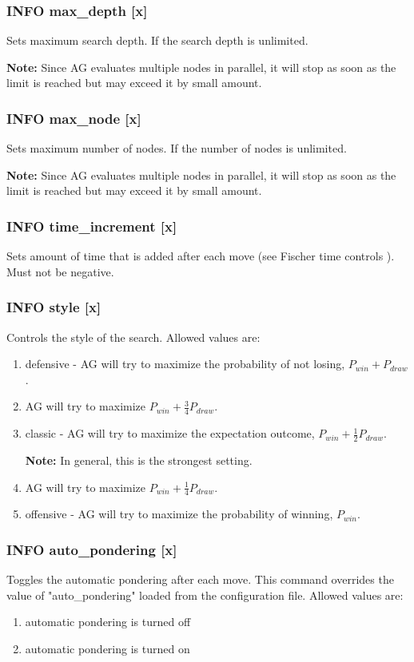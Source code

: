 \documentclass[12pt,a4paper]{article}
\begin{document}
\subsubsection{INFO max{\_}depth [x]}
Sets maximum search depth. If  the search depth is unlimited.

\textbf{Note:} Since AG evaluates multiple nodes in parallel, it will stop as soon as the limit is reached but may exceed it by small amount.

\subsubsection{INFO max{\_}node [x]}
Sets maximum number of nodes. If  the number of nodes is unlimited.

\textbf{Note:} Since AG evaluates multiple nodes in parallel, it will stop as soon as the limit is reached but may exceed it by small amount.

\subsubsection{INFO time{\_}increment [x]}
Sets amount of time that is added after each move (see Fischer time controls \cite{fischer}). Must not be negative.

\subsubsection{INFO style [x]}
Controls the style of the search. Allowed values are:
\begin{enumerate}[leftmargin=7.5em]
	\item[\text{$[x]=0$}]{defensive - AG will try to maximize the probability of not losing, $P_{win} + P_{draw}$.}
	\item[\text{$[x]=1$}]{AG will try to maximize $P_{win} + \frac{3}{4}P_{draw}$.}
	\item[\text{$[x]=2$}]{classic - AG will try to maximize the expectation outcome, $P_{win} + \frac{1}{2}P_{draw}$.
	
	\textbf{Note:} In general, this is the strongest setting.}
	\item[\text{$[x]=3$}]{AG will try to maximize $P_{win} + \frac{1}{4}P_{draw}$.}
	\item[\text{$[x]=4$}]{offensive - AG will try to maximize the probability of winning, $P_{win}$.}
\end{enumerate}

\subsubsection{INFO auto{\_}pondering [x]}
Toggles the automatic pondering after each move. This command overrides the value of "auto{\_}pondering" loaded from the configuration file. Allowed values are:
\begin{enumerate}[leftmargin=7.5em]
	\item[\text{$[x]=0$}]{automatic pondering is turned off}
	\item[\text{$[x]=1$}]{automatic pondering is turned on}
\end{enumerate}
\end{document}
